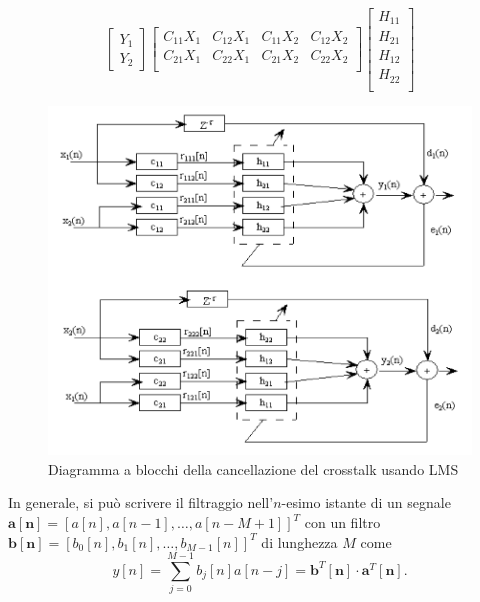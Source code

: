 \documentclass[12pt,a4paper,titlepage]{article}
\begin{document}
\begin{equation}
\begin{bmatrix}
Y_1\\
Y_2
\end{bmatrix}
\begin{bmatrix}
C_{11} X_1 & C_{12} X_1 & C_{11} X_2 & C_{12} X_2 \\ 
C_{21} X_1 & C_{22} X_1 & C_{21} X_2 & C_{22} X_2 \\ 
\end{bmatrix}
\begin{bmatrix}
H_{11}\\
H_{21}\\
H_{12}\\
H_{22}\\
\end{bmatrix}
\end{equation}
\begin{figure}[h]
	\centering	
	\includegraphics[width=\textwidth]{Immagini/lms.png}
	\caption{Diagramma a blocchi della cancellazione del crosstalk usando LMS}
	\label{fig:lms}
\end{figure}
In generale, si può scrivere il filtraggio nell'$n$-esimo istante di un segnale $\mathbf{a[n]} = \left[a[n], a[n-1], \dots, a[n - M + 1]\right]^T$ con un filtro $\mathbf{b[n]} =  \left[b_{0}[n], b_{1}[n], \dots, b_{M-1}[n]\right]^T$ di lunghezza $M$ come
\begin{equation}\label{eq:filtraggio_prodotto_scalare}
y[n] = \sum_{j=0}^{M-1}b_{j}[n]a[n-j] = \mathbf{b}^T[\mathbf{n}] \cdot \mathbf{a}^T[\mathbf{n}].
\end{equation}
\end{document}
